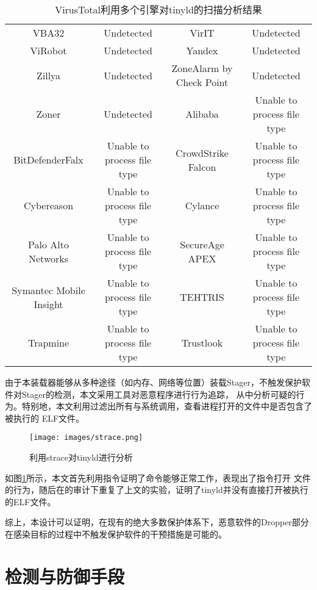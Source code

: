 \begin{table}
\begin{adjustbox}{width=\columnwidth,center}
\begin{tabular}{cccc}
    VBA32&Undetected&VirIT&Undetected\\
    ViRobot&Undetected&Yandex&Undetected\\
    Zillya&Undetected&ZoneAlarm by Check Point&Undetected\\
    Zoner&Undetected&Alibaba&Unable to process file type\\
    BitDefenderFalx&Unable to process file type&CrowdStrike Falcon&Unable to process file type\\
    Cybereason&Unable to process file type&Cylance&Unable to process file type\\
    Palo Alto Networks&Unable to process file type&SecureAge APEX&Unable to process file type\\
    Symantec Mobile Insight&Unable to process file type&TEHTRIS&Unable to process file type\\
    Trapmine&Unable to process file type&Trustlook&Unable to process file type\\
    \bottomrule
\end{tabular}
\end{adjustbox}
\caption{VirusTotal利用多个引擎对tinyld的扫描分析结果}
\label{TAB-AnalysisReport}
\end{table}

由于本装载器能够从多种途径（如内存、网络等位置）装载Stager，不触发保护软件对Stager的检测，本文采用工具对恶意程序进行行为追踪，
从中分析可疑的行为。特别地，本文利用过滤出所有与系统调用，查看进程打开的文件中是否包含了被执行的
ELF文件。

\begin{figure}[h]
    \centering
    \texttt{[image: images/strace.png]}
    \caption{利用strace对tinyld进行分析}
    \label{FIG-strace}
\end{figure}

如图\ref{FIG-strace}所示，本文首先利用指令证明了命令能够正常工作，表现出了指令打开
文件的行为，随后在的审计下重复了上文的实验，证明了tinyld并没有直接打开被执行的ELF文件。

综上，本设计可以证明，在现有的绝大多数保护体系下，恶意软件的Dropper部分在感染目标的过程中不触发保护软件的干预措施是可能的。

\section{检测与防御手段}

